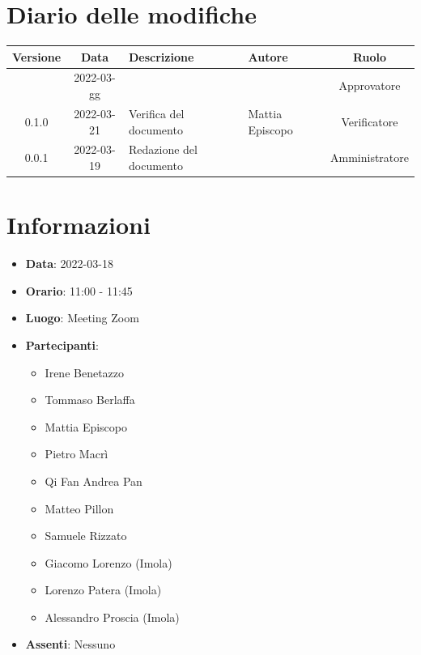 \documentclass[12pt, a4paper,table]{article}
\begin{document}
	\section*{Diario delle modifiche}
	\begin{center}
	\renewcommand{\arraystretch}{1.8} %
	\begin{tabular}{ |c|c|m{12em}|m{7em}|c| }
	\hline
	\textbf{Versione} & \textbf{Data} & \textbf{Descrizione} &  \textbf{Autore} &  \textbf{Ruolo} \\
	\hline
    & 2022-03-gg & & & Approvatore\\
	\hline
	0.1.0 & 2022-03-21 & Verifica del documento & Mattia \newline Episcopo & Verificatore\\
	\hline
	0.0.1 & 2022-03-19 & Redazione del documento & \docRedattori & Amministratore\\
	\hline
	\end{tabular}
	\end{center}
	\newpage

	\tableofcontents
	\newpage

	\section{Informazioni}
	\begin{itemize}
		\item \textbf{Data}: 2022-03-18
		\item \textbf{Orario}: 11:00 - 11:45
		\item \textbf{Luogo}: Meeting Zoom
		\item \textbf{Partecipanti}:
		\begin{itemize}
			\item Irene Benetazzo
			\item Tommaso Berlaffa
			\item Mattia Episcopo
			\item Pietro Macrì
			\item Qi Fan Andrea Pan
			\item Matteo Pillon
			\item Samuele Rizzato
			\item Giacomo Lorenzo (Imola)
            \item Lorenzo Patera (Imola)
            \item Alessandro Proscia (Imola)            
		\end{itemize}
        \item \textbf{Assenti}: Nessuno
	\end{itemize}
\end{document}
